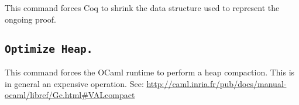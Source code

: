 This command forces Coq to shrink the data structure used to represent
the ongoing proof.

\subsection[\tt Optimize Heap.]{\tt Optimize Heap.}

This command forces the OCaml runtime to perform a heap compaction.
This is in general an expensive operation.  See:
  \url{http://caml.inria.fr/pub/docs/manual-ocaml/libref/Gc.html#VALcompact}


